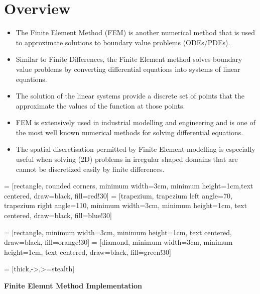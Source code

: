\documentclass[12pt]{report}
\begin{document}
\section*{Overview}
\begin{itemize}
\item The Finite Element Method (FEM) is another numerical method that is used to approximate solutions to boundary value problems (ODEs/PDEs).
\item Similar to Finite Differences, the Finite Element method solves boundary value problems by converting differential equations into systems of linear equations.
\item The solution of the linear systems provide a discrete set of points that the approximate the values of the function at those points.
\item FEM is extensively used in industrial modelling and engineering and is one of the most well known numerical methods for solving differential equations.
\item The spatial discretisation permitted by Finite Element modelling is especially useful when solving (2D) problems in irregular shaped domains that are cannot be discretized easily by finite differences.
\end{itemize}




 = [rectangle, rounded corners, minimum width=3cm, minimum height=1cm,text centered, draw=black, fill=red!30]
 = [trapezium, trapezium left angle=70, trapezium right angle=110, minimum width=3cm, minimum height=1cm, text centered, draw=black, fill=blue!30]

 = [rectangle, minimum width=3cm, minimum height=1cm, text centered, draw=black, fill=orange!30]
 = [diamond, minimum width=3cm, minimum height=1cm, text centered, draw=black, fill=green!30]

 = [thick,->,>=stealth] %

 

\begin{center}
\clearpage
\textbf{Finite Elemnt Method Implementation}
\vspace{5mm}


\end{center}
\end{document}
